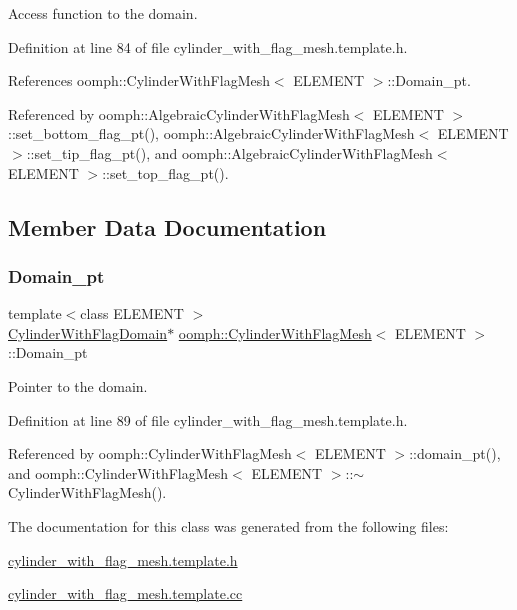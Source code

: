 Access function to the domain. 



Definition at line 84 of file cylinder\+\_\+with\+\_\+flag\+\_\+mesh.\+template.\+h.



References oomph\+::\+Cylinder\+With\+Flag\+Mesh$<$ E\+L\+E\+M\+E\+N\+T $>$\+::\+Domain\+\_\+pt.



Referenced by oomph\+::\+Algebraic\+Cylinder\+With\+Flag\+Mesh$<$ E\+L\+E\+M\+E\+N\+T $>$\+::set\+\_\+bottom\+\_\+flag\+\_\+pt(), oomph\+::\+Algebraic\+Cylinder\+With\+Flag\+Mesh$<$ E\+L\+E\+M\+E\+N\+T $>$\+::set\+\_\+tip\+\_\+flag\+\_\+pt(), and oomph\+::\+Algebraic\+Cylinder\+With\+Flag\+Mesh$<$ E\+L\+E\+M\+E\+N\+T $>$\+::set\+\_\+top\+\_\+flag\+\_\+pt().



\subsection{Member Data Documentation}
\mbox{\label{classoomph_1_1CylinderWithFlagMesh_a257b36fed6fb0d20d108a27c6a1c5f86}} 
\subsubsection{\texorpdfstring{Domain\+\_\+pt}{Domain\_pt}}
{\footnotesize\ttfamily template$<$class E\+L\+E\+M\+E\+NT $>$ \\
\hyperlink{classoomph_1_1CylinderWithFlagDomain}{Cylinder\+With\+Flag\+Domain}$\ast$ \hyperlink{classoomph_1_1CylinderWithFlagMesh}{oomph\+::\+Cylinder\+With\+Flag\+Mesh}$<$ E\+L\+E\+M\+E\+NT $>$\+::Domain\+\_\+pt\hspace{0.3cm}{\ttfamily [protected]}}



Pointer to the domain. 



Definition at line 89 of file cylinder\+\_\+with\+\_\+flag\+\_\+mesh.\+template.\+h.



Referenced by oomph\+::\+Cylinder\+With\+Flag\+Mesh$<$ E\+L\+E\+M\+E\+N\+T $>$\+::domain\+\_\+pt(), and oomph\+::\+Cylinder\+With\+Flag\+Mesh$<$ E\+L\+E\+M\+E\+N\+T $>$\+::$\sim$\+Cylinder\+With\+Flag\+Mesh().



The documentation for this class was generated from the following files\+:\begin{DoxyCompactItemize}
\item 
\hyperlink{cylinder__with__flag__mesh_8template_8h}{cylinder\+\_\+with\+\_\+flag\+\_\+mesh.\+template.\+h}\item 
\hyperlink{cylinder__with__flag__mesh_8template_8cc}{cylinder\+\_\+with\+\_\+flag\+\_\+mesh.\+template.\+cc}\end{DoxyCompactItemize}

